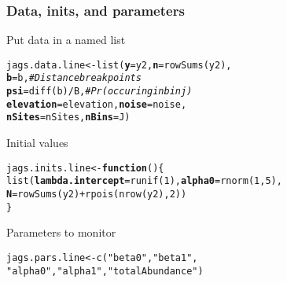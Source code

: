 \documentclass[color=usenames,dvipsnames]{beamer}\usepackage[]{graphicx}\usepackage[]{color}
\makeatletter
\newcommand{\hlnum}[1]{\textcolor[rgb]{0.69,0.494,0}{#1}}%
\newcommand{\hlstr}[1]{\textcolor[rgb]{0.749,0.012,0.012}{#1}}%
\newcommand{\hlcom}[1]{\textcolor[rgb]{0.514,0.506,0.514}{\textit{#1}}}%
\newcommand{\hlopt}[1]{\textcolor[rgb]{0,0,0}{#1}}%
\newcommand{\hlstd}[1]{\textcolor[rgb]{0,0,0}{#1}}%
\newcommand{\hlkwa}[1]{\textcolor[rgb]{0,0,0}{\textbf{#1}}}%
\newcommand{\hlkwb}[1]{\textcolor[rgb]{0,0.341,0.682}{#1}}%
\newcommand{\hlkwc}[1]{\textcolor[rgb]{0,0,0}{\textbf{#1}}}%
\newcommand{\hlkwd}[1]{\textcolor[rgb]{0.004,0.004,0.506}{#1}}%
\newenvironment{kframe}{%
 \def\at@end@of@kframe{}%
 \ifinner\ifhmode%
  \def\at@end@of@kframe{\end{minipage}}%
  \begin{minipage}{\columnwidth}%
 \fi\fi%
 \def\FrameCommand##1{\hskip\@totalleftmargin \hskip-\fboxsep
 \colorbox{shadecolor}{##1}\hskip-\fboxsep
     \hskip-\linewidth \hskip-\@totalleftmargin \hskip\columnwidth}%
 \MakeFramed {\advance\hsize-\width
   \@totalleftmargin\z@ \linewidth\hsize
   \@setminipage}}%
 {\par\unskip\endMakeFramed%
 \at@end@of@kframe}
\newenvironment{knitrout}{}{} %
\makeatother
\begin{document}
\begin{frame}[fragile]
  \frametitle{Data, inits, and parameters}
  Put data in a named list
  \vspace{-12pt}
\begin{knitrout}\footnotesize
{}\color{fgcolor}\begin{kframe}
\begin{alltt}
\hlstd{jags.data.line} \hlkwb{<-} \hlkwd{list}\hlstd{(}\hlkwc{y}\hlstd{=y2,} \hlkwc{n}\hlstd{=}\hlkwd{rowSums}\hlstd{(y2),}
                       \hlkwc{b}\hlstd{=b,}           \hlcom{# Distance break points}
                       \hlkwc{psi}\hlstd{=}\hlkwd{diff}\hlstd{(b)}\hlopt{/}\hlstd{B,} \hlcom{# Pr(occuring in bin j)}
                       \hlkwc{elevation}\hlstd{=elevation,} \hlkwc{noise}\hlstd{=noise,}
                       \hlkwc{nSites}\hlstd{=nSites,} \hlkwc{nBins}\hlstd{=J)}
\end{alltt}
\end{kframe}
\end{knitrout}
\pause
\vfill
  Initial values
  \vspace{-12pt}
\begin{knitrout}\footnotesize
{}\color{fgcolor}\begin{kframe}
\begin{alltt}
\hlstd{jags.inits.line} \hlkwb{<-} \hlkwa{function}\hlstd{() \{}
    \hlkwd{list}\hlstd{(}\hlkwc{lambda.intercept}\hlstd{=}\hlkwd{runif}\hlstd{(}\hlnum{1}\hlstd{),} \hlkwc{alpha0}\hlstd{=}\hlkwd{rnorm}\hlstd{(}\hlnum{1}\hlstd{,} \hlnum{5}\hlstd{),}
         \hlkwc{N}\hlstd{=}\hlkwd{rowSums}\hlstd{(y2)}\hlopt{+}\hlkwd{rpois}\hlstd{(}\hlkwd{nrow}\hlstd{(y2),} \hlnum{2}\hlstd{))}
\hlstd{\}}
\end{alltt}
\end{kframe}
\end{knitrout}
\pause
\vfill
  Parameters to monitor
  \vspace{-12pt}
\begin{knitrout}\small
{}\color{fgcolor}\begin{kframe}
\begin{alltt}
\hlstd{jags.pars.line} \hlkwb{<-} \hlkwd{c}\hlstd{(}\hlstr{"beta0"}\hlstd{,} \hlstr{"beta1"}\hlstd{,}
                    \hlstr{"alpha0"}\hlstd{,} \hlstr{"alpha1"}\hlstd{,} \hlstr{"totalAbundance"}\hlstd{)}
\end{alltt}
\end{kframe}
\end{knitrout}
\end{frame}
\end{document}
